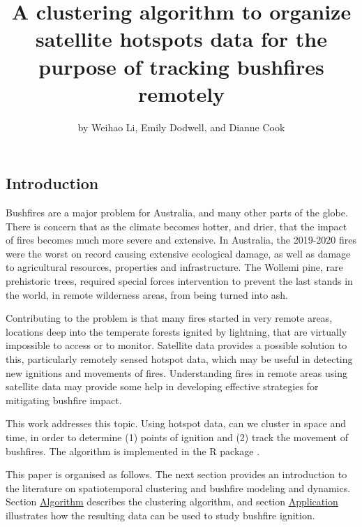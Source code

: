 \title{A clustering algorithm to organize satellite hotspots data for the
purpose of tracking bushfires remotely}
\author{by Weihao Li, Emily Dodwell, and Dianne Cook}

\maketitle


\hypertarget{introduction}{%
\subsection{Introduction}\label{introduction}}

Bushfires are a major problem for Australia, and many other parts of the
globe. There is concern that as the climate becomes hotter, and drier,
that the impact of fires becomes much more severe and extensive. In
Australia, the 2019-2020 fires were the worst on record causing
extensive ecological damage, as well as damage to agricultural
resources, properties and infrastructure. The Wollemi pine, rare
prehistoric trees, required special forces intervention to prevent the
last stands in the world, in remote wilderness areas, from being turned
into ash.

Contributing to the problem is that many fires started in very remote
areas, locations deep into the temperate forests ignited by lightning,
that are virtually impossible to access or to monitor. Satellite data
provides a possible solution to this, particularly remotely sensed
hotspot data, which may be useful in detecting new ignitions and
movements of fires. Understanding fires in remote areas using satellite
data may provide some help in developing effective strategies for
mitigating bushfire impact.

This work addresses this topic. Using hotspot data, can we cluster in
space and time, in order to determine (1) points of ignition and (2)
track the movement of bushfires. The algorithm is implemented in the R
package .

This paper is organised as follows. The next section provides an
introduction to the literature on spatiotemporal clustering and bushfire
modeling and dynamics. Section \protect\hyperlink{algorithm}{Algorithm}
describes the clustering algorithm, and section
\protect\hyperlink{application}{Application} illustrates how the
resulting data can be used to study bushfire ignition.

